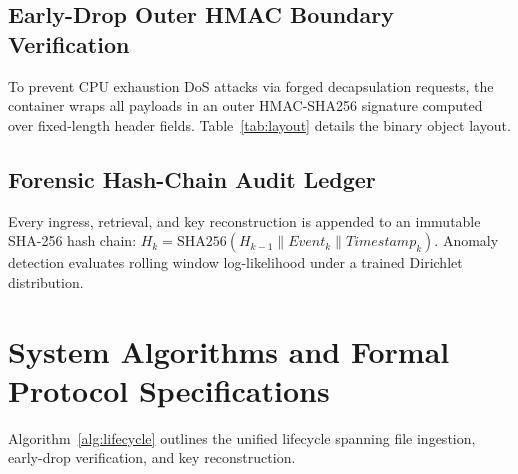 \documentclass{llncs}
\begin{document}
\subsection{Early-Drop Outer HMAC Boundary Verification}
To prevent CPU exhaustion DoS attacks via forged decapsulation requests, the container wraps all payloads in an outer HMAC-SHA256 signature computed over fixed-length header fields. Table~\ref{tab:layout} details the binary object layout.

\begin{table}[!t]
\centering
\caption{Structured container layout and cryptographic field specifications.}
\label{tab:layout}
\footnotesize
\setlength{\tabcolsep}{4pt}
\end{table}

\subsection{Forensic Hash-Chain Audit Ledger}
Every ingress, retrieval, and key reconstruction is appended to an immutable SHA-256 hash chain: $H_k = \text{SHA256}(H_{k-1} \parallel Event_k \parallel Timestamp_k)$. Anomaly detection evaluates rolling window log-likelihood under a trained Dirichlet distribution.

\section{System Algorithms and Formal Protocol Specifications}
Algorithm~\ref{alg:lifecycle} outlines the unified lifecycle spanning file ingestion, early-drop verification, and key reconstruction.
\end{document}
